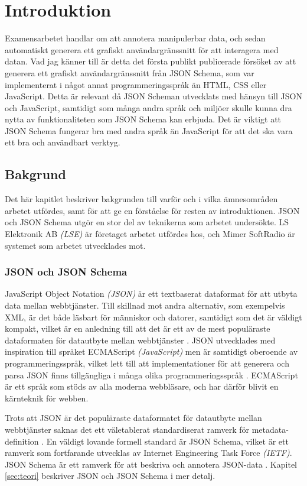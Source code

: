 \chapter{Introduktion}

Examensarbetet handlar om att annotera manipulerbar data, och sedan automatiskt generera ett grafiskt användargränssnitt för att interagera med datan. Vad jag känner till är detta det första publikt publicerade försöket av att generera ett grafiskt användargränssnitt från JSON Schema, som var implementerat i något annat programmeringsspråk än HTML, CSS eller JavaScript. Detta är relevant då JSON Scheman utvecklats med hänsyn till JSON och JavaScript, samtidigt som många andra språk och miljöer skulle kunna dra nytta av funktionaliteten som JSON Schema kan erbjuda. Det är viktigt att JSON Schema fungerar bra med andra språk än JavaScript för att det ska vara ett bra och användbart verktyg.

\section{Bakgrund}
\label{sec:intro:bakgrund}
Det här kapitlet beskriver bakgrunden till varför och i vilka ämnesområden arbetet utfördes, samt för att ge en förståelse för resten av introduktionen. JSON och JSON Schema utgör en stor del av teknikerna som arbetet undersökte. LS Elektronik AB \textit{(LSE)} är företaget arbetet utfördes hos, och Mimer SoftRadio är systemet som arbetet utvecklades mot.

\subsection{JSON och JSON Schema}
\label{sec:intro:json}
JavaScript Object Notation \textit{(JSON)} är ett textbaserat dataformat för att utbyta data mellan webbtjänster. Till skillnad mot andra alternativ, som exempelvis XML, är det både läsbart för människor och datorer, samtidigt som det är väldigt kompakt, vilket är en anledning till att det är ett av de mest populäraste dataformaten för datautbyte mellan webbtjänster \cite{Pezoa2016}. JSON utvecklades med inspiration till språket ECMAScript \textit{(JavaScript)} men är samtidigt oberoende av programmeringsspråk, vilket lett till att implementationer för att generera och parsa JSON finns tillgängliga i många olika programmeringsspråk \cite{ECMA2013}. ECMAScript är ett språk som stöds av alla moderna webbläsare, och har därför blivit en kärnteknik för webben.

Trots att JSON är det populäraste dataformatet för datautbyte mellan webbtjänster saknas det ett väletablerat standardiserat ramverk för metadata-definition \cite{Pezoa2016}. En väldigt lovande formell standard är JSON Schema, vilket är ett ramverk som fortfarande utvecklas av Internet Engineering Task Force \textit{(IETF)}. JSON Schema är ett ramverk för att beskriva och annotera JSON-data \cite{A.Wright}. Kapitel \ref{sec:teori} beskriver JSON och JSON Schema i mer detalj.

